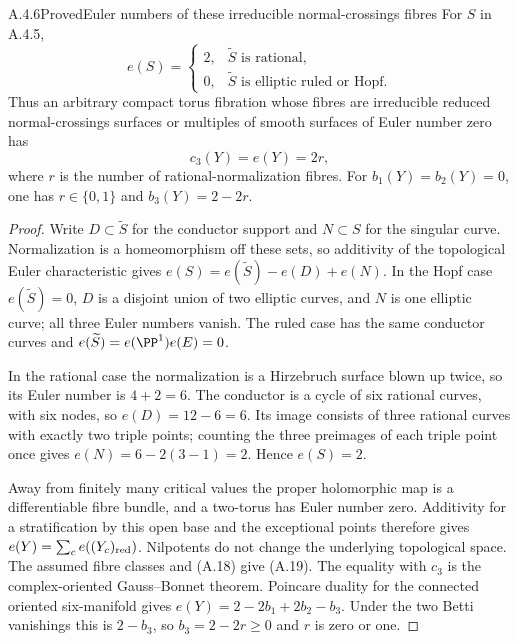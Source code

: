 \begin{statement}{A.4.6}{Proved}{Euler numbers of these irreducible normal-crossings fibres}
For $S$ in A.4.5,
\[
e(S)=\begin{cases}
2,&\widetilde S\text{ is rational},\\
0,&\widetilde S\text{ is elliptic ruled or Hopf}.
\end{cases}
\tag{A.18}
\]
Thus an arbitrary compact torus fibration whose fibres are irreducible reduced normal-crossings surfaces or multiples of smooth surfaces of Euler number zero has
\[
c_3(Y)=e(Y)=2r,
\tag{A.19}
\]
where $r$ is the number of rational-normalization fibres. For $b_1(Y)=b_2(Y)=0$, one has $r\in\{0,1\}$ and $b_3(Y)=2-2r$.
\end{statement}
\begin{proof}
Write $D\subset\widetilde S$ for the conductor support and $N\subset S$ for the singular curve. Normalization is a homeomorphism off these sets, so additivity of the topological Euler characteristic gives $e(S)=e(\widetilde S)-e(D)+e(N)$. In the Hopf case $e(\widetilde S)=0$, $D$ is a disjoint union of two elliptic curves, and $N$ is one elliptic curve; all three Euler numbers vanish. The ruled case has the same conductor curves and $e(\widetilde S)=e(\PP^1)e(E)=0$.

In the rational case the normalization is a Hirzebruch surface blown up twice, so its Euler number is $4+2=6$. The conductor is a cycle of six rational curves, with six nodes, so $e(D)=12-6=6$. Its image consists of three rational curves with exactly two triple points; counting the three preimages of each triple point once gives $e(N)=6-2(3-1)=2$. Hence $e(S)=2$.

Away from finitely many critical values the proper holomorphic map is a differentiable fibre bundle, and a two-torus has Euler number zero. Additivity for a stratification by this open base and the exceptional points therefore gives $e(Y)=\sum_c e((Y_c)_{\rm red})$. Nilpotents do not change the underlying topological space. The assumed fibre classes and (A.18) give (A.19). The equality with $c_3$ is the complex-oriented Gauss--Bonnet theorem. Poincare duality for the connected oriented six-manifold gives $e(Y)=2-2b_1+2b_2-b_3$. Under the two Betti vanishings this is $2-b_3$, so $b_3=2-2r\ge0$ and $r$ is zero or one.
\end{proof}



